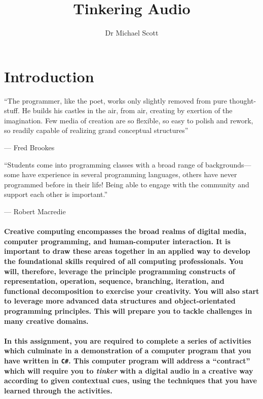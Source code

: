 \documentclass{../../fal_assignment}
\title{Tinkering Audio}
\author{Dr Michael Scott}
\begin{document}
\maketitle

\vspace{-1em}

\section*{Introduction}

\begin{marginquote}
``The programmer, like the poet, works only slightly removed from pure thought-stuff. He builds his castles in the air, from air, creating by exertion of the imagination. Few media of creation are so flexible, so easy to polish and rework, so readily capable of realizing grand conceptual structures''

--- Fred Brookes

\marginquoterule

``Students come into programming classes with a broad range of backgrounds---some have experience in several programming languages, others have never programmed before in their life! Being able to engage with the community and support each other is important.''

--- Robert Macredie 
\end{marginquote}

\paragraph{Creative computing encompasses the broad realms of digital media, computer programming, and human-computer interaction. It is important to draw these areas together in an applied way to develop the foundational skills required of all computing professionals. You will, therefore, leverage the principle programming constructs of representation, operation, sequence, branching, iteration, and functional decomposition to exercise your creativity. You will also start to leverage more advanced data structures and object-orientated programming principles. This will prepare you to tackle challenges in many creative domains.}

\paragraph{In this assignment, you are required to complete a series of activities which culminate in a demonstration of a computer program that you have written in \texttt{C\#}. This computer program will address a ``contract'' which will require you to \textit{tinker} with a digital audio in a creative way according to given contextual cues, using the techniques that you have learned through the activities.}
\end{document}
